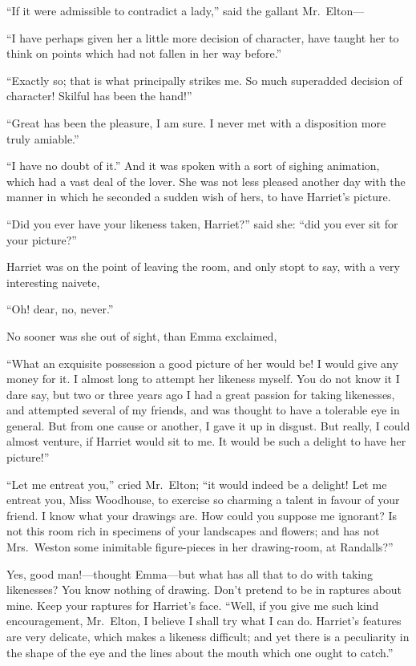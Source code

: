 ``If it were admissible to contradict a lady,'' said the gallant
Mr.\ Elton---%

``I have perhaps given her a little more decision of character,
have taught her to think on points which had not fallen in her
way before.''

``Exactly so; that is what principally strikes me.  So much superadded
decision of character! Skilful has been the hand!''

``Great has been the pleasure, I am sure.  I never met with
a disposition more truly amiable.''

``I have no doubt of it.'' And it was spoken with a sort
of sighing animation, which had a vast deal of the lover.
She was not less pleased another day with the manner
in which he seconded a sudden wish of hers, to have Harriet's picture.

``Did you ever have your likeness taken, Harriet?'' said she: ``did
you ever sit for your picture?''

Harriet was on the point of leaving the room, and only stopt to say,
with a very interesting naivete,

``Oh! dear, no, never.''

No sooner was she out of sight, than Emma exclaimed,

``What an exquisite possession a good picture of her would be! I would
give any money for it.  I almost long to attempt her likeness myself.
You do not know it I dare say, but two or three years ago I had
a great passion for taking likenesses, and attempted several of
my friends, and was thought to have a tolerable eye in general.
But from one cause or another, I gave it up in disgust.
But really, I could almost venture, if Harriet would sit to me.
It would be such a delight to have her picture!''

``Let me entreat you,'' cried Mr.\ Elton; ``it would indeed be a delight!
Let me entreat you, Miss Woodhouse, to exercise so charming a
talent in favour of your friend.  I know what your drawings are.
How could you suppose me ignorant? Is not this room rich in
specimens of your landscapes and flowers; and has not Mrs.\ Weston
some inimitable figure-pieces in her drawing-room, at Randalls?''

Yes, good man!---thought Emma---but what has all that to do with taking
likenesses? You know nothing of drawing.  Don't pretend to be
in raptures about mine.  Keep your raptures for Harriet's face.
``Well, if you give me such kind encouragement, Mr.\ Elton, I believe
I shall try what I can do.  Harriet's features are very delicate,
which makes a likeness difficult; and yet there is a peculiarity
in the shape of the eye and the lines about the mouth which one ought
to catch.''

